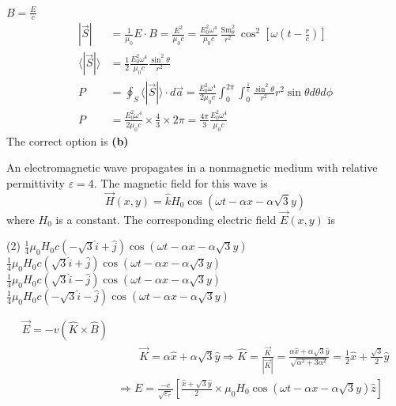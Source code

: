 \begin{enumerate}
\begin{answer}
	$B=\frac{E}{c}$
	$$\begin{aligned}
	|\vec{S}| &=\frac{1}{\mu_{0}} E \cdot B=\frac{E^{2}}{\mu_{0} c}=\frac{E_{0}^{2} \omega^{4}}{\mu_{0} c} \frac{\operatorname{Sm}_{\theta}^{2}}{r^{2}} \cos ^{2}\left[\omega\left(t-\frac{r}{c}\right)\right] \\
	\langle|\vec{S}|\rangle &=\frac{1}{2} \frac{E_{0}^{2} \omega^{4}}{\mu_{0} c} \frac{\sin ^{2} \theta}{r^{2}} \\
	P &=\oint_{S}\langle|\vec{S}|\rangle \cdot d \vec{a}=\frac{E_{0}^{2} \omega^{4}}{2 \mu_{0} c} \int_{0}^{2 \pi} \int_{0}^{\frac{1}{c}} \frac{\sin ^{2} \theta}{r^{2}} r^{2} \sin \theta d \theta d \phi \\
	P &=\frac{E_{0}^{2} \omega^{4}}{2 \mu_{0} c} \times \frac{4}{3} \times 2 \pi=\frac{4 \pi}{3} \frac{E_{0}^{2} \omega^{4}}{\mu_{0} c}
	\end{aligned}$$
	The correct option is \textbf{(b)}	
\end{answer}
\begin{minipage}{\textwidth}
	\item An electromagnetic wave propagates in a nonmagnetic medium with relative permittivity $\varepsilon=4$. The magnetic field for this wave is
	$$
	\vec{H}(x, y)=\hat{k} H_{0} \cos (\omega t-\alpha x-\alpha \sqrt{3} y)
	$$
	where $H_{0}$ is a constant. The corresponding electric field $\vec{E}(x, y)$ is
\end{minipage}
\begin{tasks}(2)
	\task[\textbf{A.}] $\frac{1}{4} \mu_{0} H_{0} c(-\sqrt{3} \hat{i}+\hat{j}) \cos (\omega t-\alpha x-\alpha \sqrt{3} y)$ 
	\task[\textbf{B.}] $\frac{1}{4} \mu_{0} H_{0} c(\sqrt{3} \hat{i}+\hat{j}) \cos (\omega t-\alpha x-\alpha \sqrt{3} y)$
	\task[\textbf{C.}]$\frac{1}{4} \mu_{0} H_{0} c(\sqrt{3} \hat{i}-\hat{j}) \cos (\omega t-\alpha x-\alpha \sqrt{3} y)$
	\task[\textbf{D.}]$\frac{1}{4} \mu_{0} H_{0} c(-\sqrt{3} \hat{i}-\hat{j}) \cos (\omega t-\alpha x-\alpha \sqrt{3} y)$
\end{tasks}
\begin{answer}
	$$
	\begin{aligned}
	\vec{E}=-v(\hat{K} \times \hat{B}) \\
	&\qquad \vec{K}=\alpha \hat{x}+\alpha \sqrt{3} \hat{y} \Rightarrow \hat{K}=\frac{\vec{K}}{|\vec{K}|}=\frac{\alpha \hat{x}+\alpha \sqrt{3} \hat{y}}{\sqrt{\alpha^{2}+3 \alpha^{2}}}=\frac{1}{2} \hat{x}+\frac{\sqrt{3}}{2} \hat{y} \\
	&\Rightarrow E=\frac{-c}{\sqrt{\varepsilon_{r}}}\left[\frac{\hat{x}+\sqrt{3} \hat{y}}{2} \times \mu_{0} H_{0} \cos (\omega t-\alpha x-\alpha \sqrt{3} y) \hat{z}\right] \\

\end{aligned}$$
\end{answer}
\end{enumerate}
